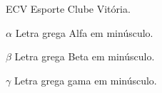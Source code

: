 

\listoffigures*
\cleardoublepage



\listofquadros*
\cleardoublepage



\listoftables*
\cleardoublepage



\begin{siglas}
	
	\item[ECV] Esporte Clube Vitória.
	
	\item[]     
	
\end{siglas}


\begin{simbolos}
	\item[$\alpha$] Letra grega Alfa em minúsculo.
	\item[$\beta$]  Letra grega Beta em minúsculo.
	\item[$\gamma$] Letra grega gama em minúsculo.
\end{simbolos}



 \tableofcontents*


